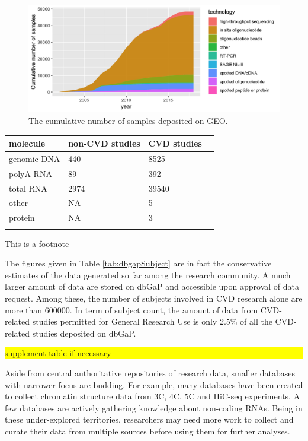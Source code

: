 \documentclass[letter]{bioinfo}
\newcommand{\todo}[1]{\colorbox{yellow}{\parbox{1\linewidth}{#1}}}
\begin{document}
\begin{figure}[!tpb]%
	\includegraphics[width=1\linewidth]{gsm_count_by_tech.png}
	\caption{The cumulative number of samples deposited on GEO.}
	\label{fig:01}
\end{figure}

\begin{table}[!t]
	 {\begin{tabular}{@{}llll@{}}\toprule 
			molecule &non-CVD studies & CVD studies \\ \midrule
			genomic DNA &            440 &        8525  \\
			polyA RNA &             89 &         392  \\
			total RNA &           2974 &       39540  \\
			other &             NA &           5  \\
			protein &             NA &           3  \\ \botrule
	\end{tabular}}{This is a footnote}
\end{table}

The figures given in Table \ref{tab:dbgapSubject} are in fact the conservative estimates of the data generated so far among the research community. A much larger amount of data are stored on dbGaP and accessible upon approval of data request. Among these, the number of subjects involved in CVD research alone are more than 600000. %
In term of subject count, the amount of data from CVD-related studies permitted for General Research Use is only
2.5\% of all the CVD-related studies deposited on dbGaP.

\todo{supplement table if necessary}

Aside from central authoritative repositories of research data, smaller databases with narrower focus are budding. For example, many databases have been created to collect chromatin structure data from 3C, 4C, 5C and HiC-seq experiments. A few databases are actively gathering knowledge about non-coding RNAs. Being in these under-explored territories, researchers may need more work to collect and curate their data from multiple sources before using them for further analyses.
\end{document}
